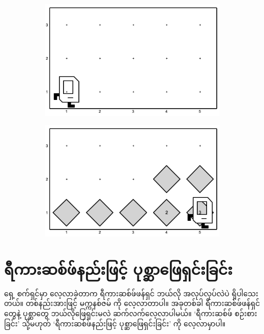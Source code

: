 \begin{figure}[thb!]
    \newcommand{\figpctw}{0.49}
    \begin{subfigure}[t]{{\figpctw}\textwidth}
        \includegraphics[scale=0.19]{images/ch04/mrofb2/1.jpg}
        \caption{}  
        \label{fig:mrofb2_1}   
    \end{subfigure}
    \begin{subfigure}[t]{{\figpctw}\textwidth}
        \includegraphics[scale=0.19]{images/ch04/mrofb2/2.jpg}
        \caption{}  
        \label{fig:mrofb2_2}  
    \end{subfigure}
    \caption{}
    \label{fig:mrofb2}
\end{figure}

\section{ရီကားဆစ်ဖ်နည်းဖြင့် ပုစ္ဆာဖြေရှင်းခြင်း}
ရှေ့ စက်ရှင်မှာ လေ့လာခဲ့တာက ရီကားဆစ်ဖ်ဖန်ရှင် ဘယ်လို အလုပ်လုပ်လဲပဲ ရှိပါသေးတယ်။ တစ်နည်း\allowbreak အားဖြင့် မက္ကနစ်ဇမ်  ကို လေ့လာတာပါ။ အခုတစ်ခါ ရီကားဆစ်ဖ်ဖန်ရှင်တွေနဲ့ ပုစ္ဆာတွေ ဘယ်လိုဖြေရှင်းမလဲ ဆက်လက်လေ့လာပါမယ်။  ‘ရီကားဆစ်ဖ် စဉ်းစားခြင်း’ \fEn{)} သို့မဟုတ် ‘ရီကားဆစ်ဖ်နည်းဖြင့် ပုစ္ဆာဖြေရှင်းခြင်း’  ကို လေ့လာမှာပါ။
